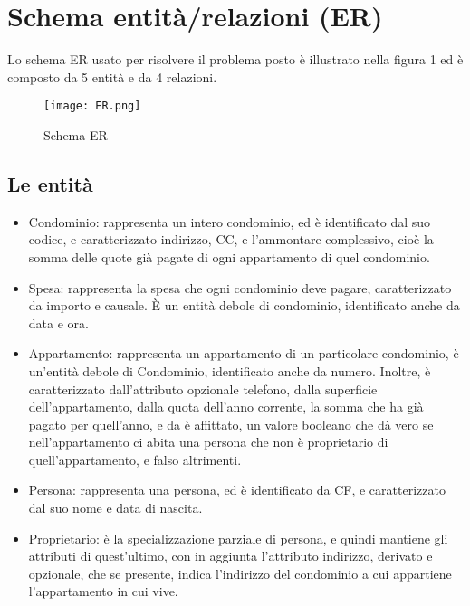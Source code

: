 \section{Schema entità/relazioni (ER)}
\label{schemaER}

Lo schema ER usato per risolvere il problema posto è
illustrato nella figura 1 ed è composto da 5 entità e da 4 relazioni.

\begin{figure}[t]
	\texttt{[image: ER.png]}
	\caption{Schema ER}
\end{figure}

\subsection{Le entità}

\begin{itemize}
    \item Condominio: rappresenta un intero condominio, ed è identificato dal suo codice, e caratterizzato indirizzo, CC, 
                      e l'ammontare complessivo, cioè la somma delle quote già pagate di ogni appartamento di quel condominio.
    \item Spesa: rappresenta la spesa che ogni condominio deve pagare, caratterizzato da importo e causale.
                 È un entità debole di condominio, identificato anche da data e ora.
    \item Appartamento: rappresenta un appartamento di un particolare condominio, è un'entità debole di Condominio, identificato anche da numero.
                        Inoltre, è caratterizzato dall'attributo opzionale telefono, dalla superficie dell'appartamento, 
                        dalla quota dell'anno corrente, la somma che ha già pagato per quell'anno, e da è affittato, un valore booleano
                        che dà vero se nell'appartamento ci abita una persona che non è proprietario di quell'appartamento, e falso altrimenti.
    \item Persona: rappresenta una persona, ed è identificato da CF, e caratterizzato dal suo nome e data di nascita.
    \item Proprietario: è la specializzazione parziale di persona, e quindi mantiene gli attributi di quest'ultimo,
                        con in aggiunta l'attributo indirizzo, derivato e opzionale, che se presente,
                        indica l'indirizzo del condominio a cui appartiene l'appartamento in cui vive.                        
\end{itemize}


